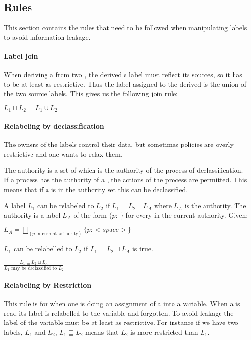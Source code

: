 \subsection{Rules}
This section contains the rules that need to be followed when manipulating labels to avoid information leakage.

\paragraph{Label join}
When deriving a \xvalue{} from two \xvalues{}, the derived \xvalue{}s label must reflect its sources, so it has to be at least as restrictive.
Thus the label assigned to the derived \xvalue{} is the union of the two source labels.
This gives us the following join rule:
\begin{definition}
  $L_1 \sqcup L_2 = L_1 \cup L_2$
\end{definition}


\paragraph{Relabeling by declassification}
The owners of the labels control their data, but sometimes policies are overly restrictive and one wants to relax them.

The authority is a set of \principals{} which is the authority of the process of declassification.
If a process has the authority of a \principal{}, the actions of the process are permitted.
This means that if a \principal{} is in the authority set this can be declassified.

A label $L_1$ can be relabeled to $L_2$ if $L_1 \sqsubseteq L_2 \sqcup L_A$ where $L_A$ is the authority.
The authority is a label $L_A$ of the form $\{p: \ \}$ for every \principal{} in the current authority.
Given:
\begin{center}
  $L_A = \bigsqcup_{(p \text{ in current authority})}\{p: <space> \}$
\end{center}
$L_1$ can be relabelled to $L_2$ if $L_1 \sqsubseteq L_2 \sqcup L_A$ is true.
\begin{definition}
    $\frac{L_1 \sqsubseteq L_2 \sqcup L_A}{L_1 \text{ may be declassified to } L_2}$
\end{definition}

\paragraph{Relabeling by Restriction}
This rule is for when one is doing an assignment of a \xvalue{} into a variable.
When a \xvalue{} is read its label is relabelled to the variable and forgotten.
To avoid leakage the label of the variable must be at least as restrictive.
For instance if we have two labels, $L_1$ and $L_2$, $L_1 \sqsubseteq L_2$ means that $L_2$ is more restricted than $L_1$.

